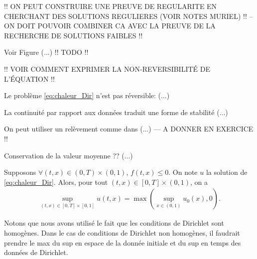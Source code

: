 \documentclass[12pt,a4paper,twoside]{article}
\begin{document}
!! ON PEUT CONSTRUIRE UNE PREUVE DE REGULARITE EN CHERCHANT DES SOLUTIONS REGULIERES
(VOIR NOTES MURIEL) !! 
-- ON DOIT POUVOIR COMBINER CA AVEC LA PREUVE DE LA RECHERCHE DE SOLUTIONS FAIBLES !!

Voir Figure (...) !! TODO !!


!! VOIR COMMENT EXPRIMER LA NON-REVERSIBILIT\'E DE L'\'EQUATION !!

\begin{proposition}
  Le probl\`eme \eqref{eq:chaleur_Dir} n'est pas r\'eversible:
  (...)
\end{proposition}




\begin{remark}
  La continuit\'e par rapport aux donn\'ees traduit une forme de stabilit\'e
  (...)
\end{remark}

\begin{remark}
  On peut utiliser un rel\`evement comme dans (...) --- A DONNER EN EXERCICE !!
\end{remark}

\begin{remark}
  Conservation de la valeur moyenne ??
  (...)
\end{remark}

\begin{proposition}
  Supposons $\forall (t,x) \in (0,T) \times (0,1)$,
  $f(t,x) \leq 0$. On note $u$ la solution de \eqref{eq:chaleur_Dir}.
  Alors, pour tout $(t,x) \in [0,T] \times (0,1)$, on a 
  \begin{align*}
    \sup_{(t,x) \in [0,T] \times [0,1]} u(t,x) = \max(\sup_{x \in (0,1)} u_0(x) , 0 ) .
  \end{align*}
\end{proposition}
Notons que nous avons utilis\'e le fait que les conditions de Dirichlet sont homog\`enes.
Dans le cas de conditions de Dirichlet non homog\`enes, il faudrait prendre le max
du sup en espace de la donn\'ee initiale et du sup en temps des donn\'ees de Dirichlet.
\end{document}
